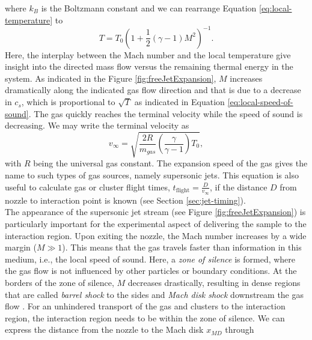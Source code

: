where $k_{B}$ is the Boltzmann constant and we can rearrange Equation \eqref{eq:local-temperature} to 
\begin{equation}
T=T_{0}\left(1+\frac{1}{2}\left(\gamma - 1\right)M^{2}\right)^{-1}.
\label{eq:local-temperature-definition}
\end{equation}
Here, the interplay between the Mach number and the local temperature give insight into the directed mass flow versus the remaining thermal energy in the system. As indicated in the Figure \ref{fig:freeJetExpansion}, $M$ increases dramatically along the indicated gas flow direction and that is due to a decrease in $c_{s}$, which is proportional to $\sqrt{T}$ as indicated in Equation \eqref{eq:local-speed-of-sound}. The gas quickly reaches the terminal velocity while the speed of sound is decreasing. We may write the terminal velocity as
\begin{equation}
v_{\infty}=\sqrt{\frac{2 R}{m_{gas}}\left(\frac{\gamma}{\gamma-1}\right) T_{0}},
\label{eq:terminal-velocity}
\end{equation}
with $R$ being the universal gas constant. The expansion speed of the gas gives the name to such types of gas sources, namely supersonic jets. This equation is also useful to calculate gas or cluster flight times, $t_{\text{flight}}=\frac{D}{v_{\infty}}$, if the distance $D$ from nozzle to interaction point is known (see Section \ref{sec:jet-timing}). \\[1\baselineskip]
%
The appearance of the supersonic jet stream (see Figure \ref{fig:freeJetExpansion}) is particularly important for the experimental aspect of delivering the sample to the interaction region. Upon exiting the nozzle, the Mach number increases by a wide margin ($M\gg 1$). This means that the gas travels faster than information in this medium, i.e., the local speed of sound. Here, a \textit{zone of silence} is formed, where the gas flow is not influenced by other particles or boundary conditions.
At the borders of the zone of silence, $M$ decreases drastically, resulting in dense regions that are called \textit{barrel shock} to the sides and \textit{Mach disk shock} downstream the gas flow \citep{Miller-1988-Oxford}. For an unhindered transport of the gas and clusters to the interaction region, the interaction region needs to be within the zone of silence. We can express the distance from the nozzle to the Mach disk $x_{MD}$ through
